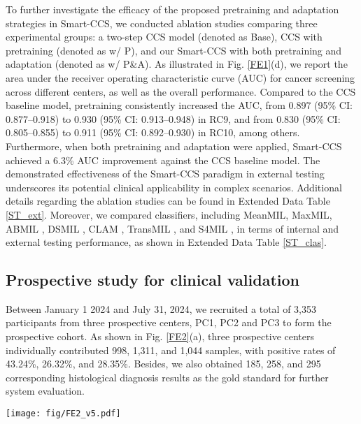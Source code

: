 To further investigate the efficacy of the proposed pretraining and adaptation strategies in Smart-CCS, we conducted ablation studies comparing three experimental groups: a two-step CCS model (denoted as Base), CCS with pretraining (denoted as w/ P), and our Smart-CCS with both pretraining and adaptation (denoted as w/ P\&A). As illustrated in Fig. \ref{FE1}(d), we report the area under the receiver operating characteristic curve (AUC) for cancer screening across different centers, as well as the overall performance. Compared to the CCS baseline model, pretraining consistently increased the AUC, from 0.897 (95\% CI: 0.877–0.918) to 0.930 (95\% CI: 0.913–0.948) in RC9, and from 0.830 (95\% CI: 0.805–0.855) to 0.911 (95\% CI: 0.892–0.930) in RC10, among others. Furthermore, when both pretraining and adaptation were applied, Smart-CCS achieved a 6.3\% AUC improvement against the CCS baseline model. The demonstrated effectiveness of the Smart-CCS paradigm in external testing underscores its potential clinical applicability in complex scenarios. Additional details regarding the ablation studies can be found in Extended Data Table \ref{ST_ext}. Moreover, we compared classifiers, including MeanMIL, MaxMIL, ABMIL \cite{ilse2018attention}, DSMIL \cite{li2021dual}, CLAM \cite{shao2021transmil}, TransMIL \cite{lu2021data}, and S4MIL \cite{fillioux2023structured}, in terms of internal and external testing performance, as shown in Extended Data Table \ref{ST_clas}.

\subsection*{Prospective study for clinical validation}\label{subsec2-6}
Between January 1 2024 and July 31, 2024, we recruited a total of 3,353 participants from three prospective centers, PC1, PC2 and PC3 to form the prospective cohort. 
As shown in Fig. \ref{FE2}(a), three prospective centers individually contributed 998, 1,311, and 1,044 samples, with positive rates of 43.24\%, 26.32\%, and 28.35\%. Besides, we also obtained 185, 258, and 295 corresponding histological diagnosis results as the gold standard for further system evaluation.

\begin{figure*}[htbp]
    \centering
    \texttt{[image: fig/FE2\_v5.pdf]}
    \caption{\textbf{Performance of Smart-CCS in the prospective study.} \textbf{a}. Grade distribution among three prospective centers (PC1, PC2 and PC3) and reported evaluation results from our Smart-CCS system. \textbf{b}. The diagnostic performance of Smart-CCS in cancer detection using histological results as the gold standard. \textbf{c}. Visualizations from cervical cancer screenings, which include interpretable results at both the cell-level and slide-level, derived from three sample tests.}
    \label{FE2}
\end{figure*}


